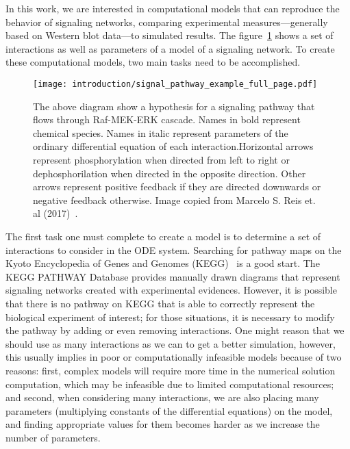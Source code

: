 In this work, we are interested in computational models that can 
reproduce the behavior of signaling networks, comparing experimental 
measures---generally based on Western blot data---to simulated results.
The figure~\ref{fig:signal_pathway_example} shows a set of interactions
as well as parameters of a model of a signaling network. To create these 
computational models, two main tasks need to be accomplished.

\begin{figure}[!ht]
\centering 
    \texttt{[image: introduction/signal\_pathway\_example\_full\_page.pdf]}
\caption{The above diagram show a hypothesis for a signaling pathway 
    that flows through Raf-MEK-ERK cascade. Names in bold represent 
    chemical species. Names in italic represent parameters of the 
    ordinary differential equation of each interaction.Horizontal arrows
    represent phosphorylation when directed from left to right or 
    dephosphorilation when directed in the opposite direction. Other 
    arrows represent positive feedback if they are directed downwards or 
    negative feedback otherwise. Image copied from Marcelo S. Reis et.
    al (2017)~\cite{Reis2017}.}
\label{fig:signal_pathway_example}
\end{figure}

The first task one must complete to create a model is to determine a set 
of interactions to consider in the ODE system. Searching for pathway maps
on the Kyoto Encyclopedia of Genes and Genomes 
(KEGG)~\cite{Kanehisa2000kegg} is a good start. The KEGG PATHWAY 
Database provides manually drawn diagrams that represent signaling 
networks created with experimental evidences. However, it is possible 
that there is no pathway on KEGG that is able to correctly represent the 
biological experiment of interest; for those situations, it is necessary 
to modify the pathway by adding or even removing interactions. One might 
reason that we should use as many interactions as we can to get a better 
simulation, however, this usually implies in poor or computationally 
infeasible models because of two reasons: first, complex models will 
require more time in the numerical solution computation, which may be 
infeasible due to limited computational resources; and second, when 
considering many interactions, we are also placing many parameters 
(multiplying constants of the differential equations) on the model, and 
finding appropriate values for them becomes harder as we increase the 
number of parameters.

